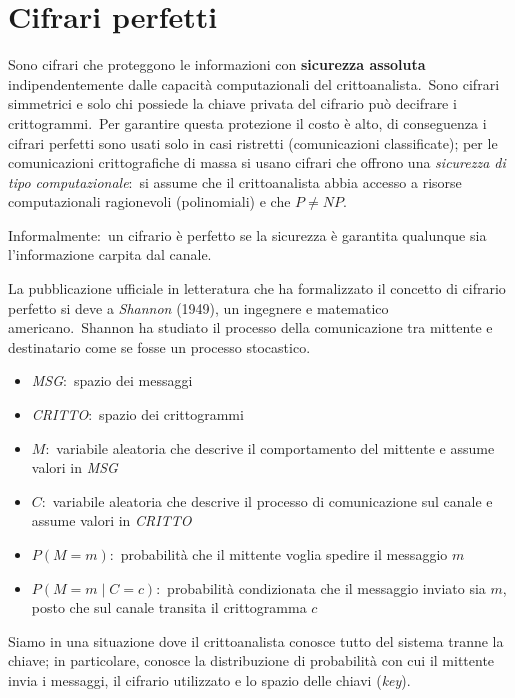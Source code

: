 \chapter{Cifrari perfetti}

Sono cifrari che proteggono le informazioni con \textbf{sicurezza assoluta} indipendentemente dalle capacità computazionali del crittoanalista.\
Sono cifrari simmetrici e solo chi possiede la chiave privata del cifrario può decifrare i crittogrammi.\
Per garantire questa protezione il costo è alto, di conseguenza i cifrari perfetti sono usati solo in casi ristretti (comunicazioni classificate); per le comunicazioni crittografiche di massa si usano cifrari che offrono una \textit{sicurezza di tipo computazionale}:\ si assume che il crittoanalista abbia accesso a risorse computazionali ragionevoli (polinomiali) e che $P\neq NP$.\

\vspace{12pt}
\noindent Informalmente:\ un cifrario è perfetto se la sicurezza è garantita qualunque sia l'informazione carpita dal canale.\
\vspace{12pt}

\noindent La pubblicazione ufficiale in letteratura che ha formalizzato il concetto di cifrario perfetto si deve a \textit{Shannon} (1949), un ingegnere e matematico americano.\
Shannon ha studiato il processo della comunicazione tra mittente e destinatario come se fosse un processo stocastico.\

\begin{itemize}
    \item \textit{MSG}:\ spazio dei messaggi
    \item \textit{CRITTO}:\ spazio dei crittogrammi
    \item $M$:\ variabile aleatoria che descrive il comportamento del mittente e assume valori in \textit{MSG}
    \item $C$:\ variabile aleatoria che descrive il processo di comunicazione sul canale e assume valori in \textit{CRITTO}
    \item $P(M = m)$:\ probabilità che il mittente voglia spedire il messaggio $m$
    \item $P(M = m \mid C = c)$:\ probabilità condizionata che il messaggio inviato sia $m$, posto che sul canale transita il crittogramma $c$
\end{itemize}

\noindent Siamo in una situazione dove il crittoanalista conosce tutto del sistema tranne la chiave; in particolare, conosce la distribuzione di probabilità con cui il mittente invia i messaggi, il cifrario utilizzato e lo spazio delle chiavi (\textit{key}).

